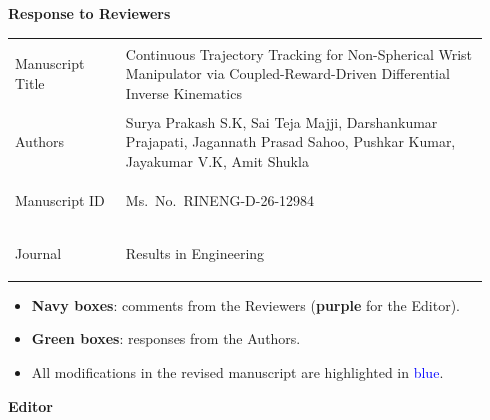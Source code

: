 \documentclass[11pt]{elsarticle}
\newcommand{\topicheading}[1]{%
  \par\vspace{1.2em}%
  \phantomsection\pdfbookmark[1]{#1}{#1}%
  \begin{tcolorbox}[enhanced, colback=topicbar, colframe=topicbar,
      arc=1pt, boxrule=0pt, left=8pt, top=4pt, bottom=4pt,
      before skip=0pt, after skip=0.6em]
    {\color{white}\large\bfseries #1}
  \end{tcolorbox}}
\begin{document}

\begin{tcolorbox}[enhanced, colback=white, colframe=topicbar, boxrule=0.8pt,
    arc=2pt, left=10pt, right=10pt, top=8pt, bottom=8pt]
  \begin{center}
    {\LARGE\bfseries\color{topicbar} Response to Reviewers}
  \end{center}
  \vspace{0.3em}
  \renewcommand{\arraystretch}{1.25}
  \begin{tabular}{@{}>{\bfseries\raggedright\arraybackslash}p{0.22\linewidth}>{\raggedright\arraybackslash}p{0.72\linewidth}@{}}
    Manuscript Title & Continuous Trajectory Tracking for Non-Spherical Wrist Manipulator via Coupled-Reward-Driven Differential Inverse Kinematics \\
    Authors          & Surya Prakash S.K, Sai Teja Majji, Darshankumar Prajapati, Jagannath Prasad Sahoo, Pushkar Kumar, Jayakumar V.K, Amit Shukla \\
    Manuscript ID    & Ms.\ No.\ RINENG-D-26-12984 \\
    Journal          & Results in Engineering \\
  \end{tabular}
\end{tcolorbox}

\begin{tcolorbox}[enhanced, colback=noteback, colframe=noteframe, boxrule=0pt,
    leftrule=3pt, arc=1pt, left=8pt, top=4pt, bottom=4pt,
    title={Note / Colour Key}, fonttitle=\bfseries\small, coltitle=white]
  \begin{itemize}[leftmargin=1.2em]
    \item \textcolor{commentframe}{\textbf{Navy boxes}}: comments from the Reviewers
          (\textcolor{editorframe}{\textbf{purple}} for the Editor).
    \item \textcolor{responseframe}{\textbf{Green boxes}}: responses from the Authors.
    \item All modifications in the revised manuscript are highlighted in \textcolor{blue}{blue}.
  \end{itemize}
\end{tcolorbox}

\topicheading{Editor}
\end{document}
